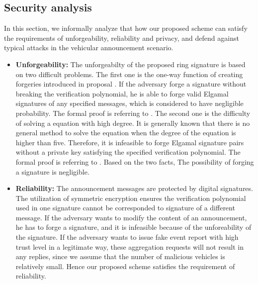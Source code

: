 \documentclass[a4paper]{article}
\begin{document}
\subsection{Security analysis}
In this section, we informally analyze that how our proposed scheme can satisfy the requirements of unforgeability, reliability and privacy, and defend against typical attacks in the vehicular announcement scenario.
\begin{itemize}
  \item \textbf{Unforgeability:} The unforgeabilty of the proposed ring signature is based on two difficult problems. The first one is the one-way function of creating forgeries introduced in proposal \cite{RH08}. If the adversary forge a signature without breaking the verification polynomial, he is able to forge valid Elgamal signatures of any specified messages, which is considered to have negligible probability. The formal proof is referring to \cite{RH08}. The second one is the difficulty of solving a equation with high degree. It is generally known that there is no general method to solve the equation when the degree of the equation is higher than five. Therefore, it is infeasible to forge Elgamal signature pairs without a private key satisfying the specified verification polynomial. The formal proof is referring to \cite{BSS02}. Based on the two facts, The possibility of forging a signature is negligible.
  \item \textbf{Reliability:} The announcement messages are protected by digital signatures. The utilization of symmetric encryption ensures the verification polynomial used in one signature cannot be corresponded to signature of a different message. If the adversary wants to modify the content of an announcement, he has to forge a signature, and it is infeasible because of the unforeability of the signature. If the adversary wants to issue fake event report with high trust level in a legitimate way, these aggregation requests will not result in any replies, since we assume that the number of malicious vehicles is relatively small. Hence our proposed scheme satisfies the requirement of reliability.

\end{itemize}
\end{document}

